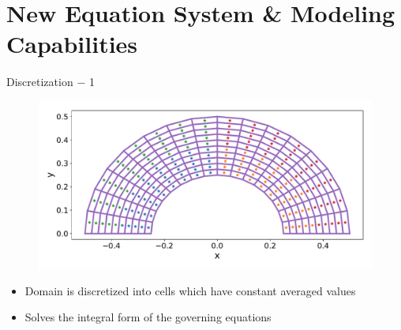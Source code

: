 \section{New Equation System \& Modeling Capabilities}

\begin{frame}[t]{Discretization $-$ 1}
 
 \vspace{-0.55cm}
  \begin{figure}[!htbp]
   \includegraphics[width=0.85\linewidth]{../fig/16x10mesh}
   \centering
 \end{figure}

 \vspace{-0.5cm}
  \begin{itemize}
    \item Domain is discretized into cells which have constant averaged values
    \item Solves the integral form of the governing equations
  \end{itemize}

\end{frame}


